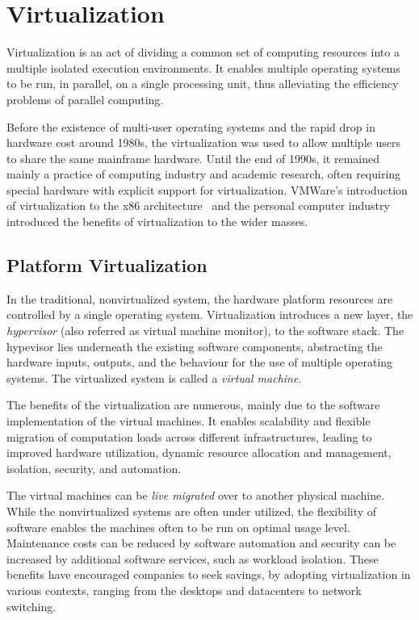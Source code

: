 \section{Virtualization}
\label{section:virtualization}
Virtualization is an act of dividing a common set of computing resources into a multiple isolated execution environments. It enables multiple operating systems to be run, in parallel, on a single processing unit, thus alleviating the efficiency problems of parallel computing.

Before the existence of multi-user operating systems and the rapid drop in hardware cost around 1980s, the virtualization was used to allow multiple users to share the same mainframe hardware. Until the end of 1990s, it remained mainly a practice of computing industry and academic research, often requiring special hardware with explicit support for virtualization. VMWare's introduction of virtualization to the x86 architecture~\cite{Walters:1999:VVP} and the personal computer industry introduced the benefits of virtualization to the wider masses.~\cite{Bugnion:2012:BVX, Barham:2003:XAV}

\subsection{Platform Virtualization}
In the traditional, nonvirtualized system, the hardware platform resources are controlled by a single operating system. Virtualization introduces a new layer, the \emph{hypervisor} (also referred as virtual machine monitor), to the software stack. The hypevisor lies underneath the existing software components, abstracting the hardware inputs, outputs, and the behaviour for the use of multiple operating systems. The virtualized system is called a \emph{virtual machine}.~\cite{Uhlig:2005:IVT, Bugnion:2012:BVX, Barham:2003:XAV}

The benefits of the virtualization are numerous, mainly due to the software implementation of the virtual machines. It enables scalability and flexible migration of computation loads across different infrastructures, leading to improved hardware utilization, dynamic resource allocation and management, isolation, security, and automation.~\cite{Pearce:2013:VIS}

The virtual machines can be \emph{live migrated} over to another physical machine. While the nonvirtualized systems are often under utilized, the flexibility of software enables the machines often to be run on optimal usage level. Maintenance costs can be reduced by software automation and security can be increased by additional software services, such as workload isolation. These benefits have encouraged companies to seek savings, by adopting virtualization in various contexts, ranging from the desktops and datacenters to network switching.~\cite{Uhlig:2005:IVT, Pearce:2013:VIS}

